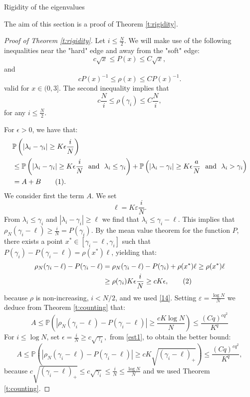 \documentclass[11pt, a4paper, oneside]{book}
\numberwithin{equation}{chapter}
\newcommand{\PP}{\mathbb P}
\newcommand{\beq}{\begin{equation}}
\newcommand{\eeq}{\end{equation}}
\newcommand\numberthis{\addtocounter{equation}{1}\tag{\theequation}}
\begin{document}
\begin{section}{Rigidity of the eigenvalues}

The aim of this section is a proof of Theorem \ref{t:rigidity}.
%
\begin{proof}[Proof of Theorem \ref{t:rigidity}]
Let $i \leq \frac{N}{2}$. We will make use of the following inequalities near the "hard" edge and away from the "soft" edge:
%
\beq \label{est1} c \sqrt{x} \leq  P(x) \leq C \sqrt{x} , \eeq and \beq \label{est2} c  P(x)^{-1} \leq \rho(x) \leq C  P(x)^{-1} . \eeq
%
valid for $x\in (0,3] .$ The second inequality implies that
%
\beq \label{14}
c \frac{N}{i} \leq \rho(\gamma_i) \leq C  \frac{N}{i},
\eeq
for any $i \leq \frac{N}{2}.$

For $\epsilon > 0$, we have that:
\begin{align*}
&\mathbb{P} \left ( | \lambda_i - \gamma_i | \geq K \epsilon \frac{i}{N}  \right ) \\
&\leq \mathbb{P} \left ( | \lambda_i - \gamma_i | \geq K\epsilon\frac{i}{N}  \ \ \text{and} \ \ \lambda_i \leq \gamma_i \right ) + \mathbb{P} \left ( | \lambda_i - \gamma_i | \geq K\epsilon \frac{a}{N} \  \ \text{and} \ \ \lambda_i >\gamma_i \right ) \\
&= A + B \numberthis .
\end{align*}
%
We consider first the term $A.$ We set
$$\ell = K \varepsilon\frac{i}{N}.$$
%
From $ \lambda_i \leq \gamma_i $ and $| \lambda_i - \gamma_i | \geq \ell$ we find that $\lambda_i \leq \gamma_i - \ell .$ This implies that $ \rho_N( \gamma_i - \ell ) \geq \frac{i}{N} = P(\gamma_i)$. By the mean value theorem for the function $P$, there exists a point $x^* \in [\gamma_i - \ell , \gamma_i ] $ such that
$P(\gamma_i ) - P(\gamma_i - \ell ) = \rho(x^*) \ell$, yielding that:
%
\begin{align*}
\rho_N(\gamma_i - \ell) - P(\gamma_i - \ell) &= \rho_N(\gamma_i - \ell) - P(\gamma_i) + \rho(x^*)\ell
\geq \rho(x^*) \ell \\
&\geq \rho(\gamma_i) K \epsilon \frac{i}{N} \geq  cK \epsilon, \numberthis
\end{align*}
%
because $\rho$ is non-increasing, $i < N/2$, and we used \eqref{14}.
Setting $\varepsilon = \frac{\log N}{N} $ we deduce from Theorem \ref{t:counting} that:
%
\begin{equation} A \leq \PP \left ( |\rho_N(\gamma_i - \ell) - P(\gamma_i - \ell) | \geq  \frac{cK\log N}{N} \right ) \leq \frac{(Cq)^{cq^2}}{K^q}
\end{equation}
%
For $i \leq \log N$, set $\epsilon = \frac{i}{N} \geq c\sqrt{\gamma_i},$ from \eqref{est1}, to obtain the better bound:
%
\begin{equation}
A \leq \PP \left ( |\rho_N(\gamma_i - \ell) - P(\gamma_i - \ell) | \geq cK \sqrt{(\gamma_i - \ell)_+} \right )
\leq \frac{(Cq)^{cq^2}}{K^q},
\end{equation} 
%
because $ c\sqrt{(\gamma_i - \ell)_+} \leq c\sqrt{\gamma_i} \leq \frac{i}{N} \leq \frac{\log N}{N}$ and we used Theorem \ref{t:counting}. 


\end{proof}
\end{section}
\end{document}
